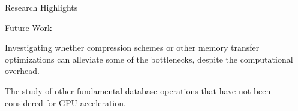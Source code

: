 \documentclass[final]{beamer}
\newlength{\sepwidth}
\newlength{\colwidth}
\newcommand{\separatorcolumn}{\begin{column}{\sepwidth}\end{column}}
\begin{document}
\begin{frame}[t]
\begin{columns}[t]
\begin{column}{\colwidth}
\begin{block}{Research Highlights}
\end{block} 






\begin{block}{Future Work}



\begin{description}[font=$\bullet$~\normalfont\scshape\color{red!50!black}]

\item Investigating whether compression schemes or other memory transfer optimizations can alleviate some of the bottlenecks, despite the computational overhead.

\item The study of other fundamental database operations that have not been considered for GPU acceleration.


\end{description}






\end{block}



\end{column}

\separatorcolumn
\end{columns}
\end{frame}
\end{document}
